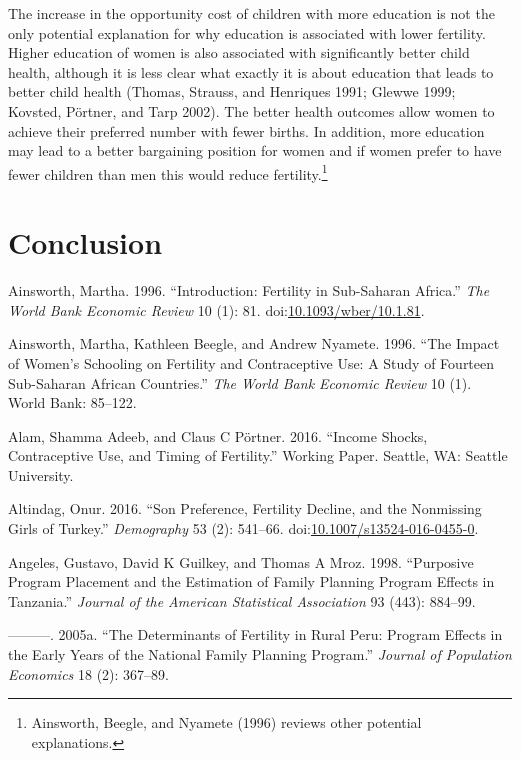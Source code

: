 \documentclass[]{article}
\begin{document}
The increase in the opportunity cost of children with more education is not the only potential explanation for why education is associated with lower fertility. Higher education of women is also associated with significantly better child health, although it is less clear what exactly it is about education that leads to better child health (Thomas, Strauss, and Henriques 1991; Glewwe 1999; Kovsted, Pörtner, and Tarp 2002). The better health outcomes allow women to achieve their preferred number with fewer births. In addition, more education may lead to a better bargaining position for women and if women prefer to have fewer children than men this would reduce fertility.\footnote{Ainsworth, Beegle, and Nyamete (1996) reviews other potential explanations.}

\section*{Conclusion}\label{conclusion}

\hypertarget{refs}{}
\hypertarget{ref-Ainsworth1996a}{}
Ainsworth, Martha. 1996. ``Introduction: Fertility in Sub-Saharan Africa.'' \emph{The World Bank Economic Review} 10 (1): 81. doi:\href{https://doi.org/10.1093/wber/10.1.81}{10.1093/wber/10.1.81}.

\hypertarget{ref-Ainsworth1996}{}
Ainsworth, Martha, Kathleen Beegle, and Andrew Nyamete. 1996. ``The Impact of Women's Schooling on Fertility and Contraceptive Use: A Study of Fourteen Sub-Saharan African Countries.'' \emph{The World Bank Economic Review} 10 (1). World Bank: 85--122.

\hypertarget{ref-Alam2016}{}
Alam, Shamma Adeeb, and Claus C Pörtner. 2016. ``Income Shocks, Contraceptive Use, and Timing of Fertility.'' Working Paper. Seattle, WA: Seattle University.

\hypertarget{ref-Altindag2016}{}
Altindag, Onur. 2016. ``Son Preference, Fertility Decline, and the Nonmissing Girls of Turkey.'' \emph{Demography} 53 (2): 541--66. doi:\href{https://doi.org/10.1007/s13524-016-0455-0}{10.1007/s13524-016-0455-0}.

\hypertarget{ref-angeles98}{}
Angeles, Gustavo, David K Guilkey, and Thomas A Mroz. 1998. ``Purposive Program Placement and the Estimation of Family Planning Program Effects in Tanzania.'' \emph{Journal of the American Statistical Association} 93 (443): 884--99.

\hypertarget{ref-Angeles2005a}{}
---------. 2005a. ``The Determinants of Fertility in Rural Peru: Program Effects in the Early Years of the National Family Planning Program.'' \emph{Journal of Population Economics} 18 (2): 367--89.
\end{document}
